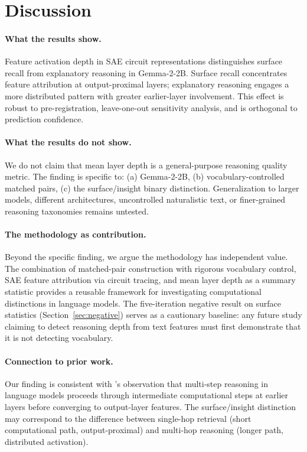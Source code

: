\documentclass[10pt]{article}
\begin{document}
\section{Discussion}

\paragraph{What the results show.}
Feature activation depth in SAE circuit representations distinguishes surface recall from explanatory reasoning in Gemma-2-2B. Surface recall concentrates feature attribution at output-proximal layers; explanatory reasoning engages a more distributed pattern with greater earlier-layer involvement. This effect is robust to pre-registration, leave-one-out sensitivity analysis, and is orthogonal to prediction confidence.

\paragraph{What the results do not show.}
We do not claim that mean layer depth is a general-purpose reasoning quality metric. The finding is specific to: (a) Gemma-2-2B, (b) vocabulary-controlled matched pairs, (c) the surface/insight binary distinction. Generalization to larger models, different architectures, uncontrolled naturalistic text, or finer-grained reasoning taxonomies remains untested.

\paragraph{The methodology as contribution.}
Beyond the specific finding, we argue the methodology has independent value. The combination of matched-pair construction with rigorous vocabulary control, SAE feature attribution via circuit tracing, and mean layer depth as a summary statistic provides a reusable framework for investigating computational distinctions in language models. The five-iteration negative result on surface statistics (Section~\ref{sec:negative}) serves as a cautionary baseline: any future study claiming to detect reasoning depth from text features must first demonstrate that it is not detecting vocabulary.

\paragraph{Connection to prior work.}
Our finding is consistent with \citet{anthropic2025biology}'s observation that multi-step reasoning in language models proceeds through intermediate computational steps at earlier layers before converging to output-layer features. The surface/insight distinction may correspond to the difference between single-hop retrieval (short computational path, output-proximal) and multi-hop reasoning (longer path, distributed activation).
\end{document}
